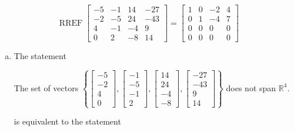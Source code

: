 \begin{exerciseAnswer} 


\[\operatorname{RREF} \left[\begin{array}{cccc}
-5 & -1 & 14 & -27 \\
-2 & -5 & 24 & -43 \\
4 & -1 & -4 & 9 \\
0 & 2 & -8 & 14
\end{array}\right] = \left[\begin{array}{cccc}
1 & 0 & -2 & 4 \\
0 & 1 & -4 & 7 \\
0 & 0 & 0 & 0 \\
0 & 0 & 0 & 0
\end{array}\right] \]


\begin{enumerate}[(a)]
\item The statement 
\begin{center}\begin{minipage}{0.8\textwidth}
 The set of vectors \( \left\{ \left[\begin{array}{c}
-5 \\
-2 \\
4 \\
0
\end{array}\right] , \left[\begin{array}{c}
-1 \\
-5 \\
-1 \\
2
\end{array}\right] , \left[\begin{array}{c}
14 \\
24 \\
-4 \\
-8
\end{array}\right] , \left[\begin{array}{c}
-27 \\
-43 \\
9 \\
14
\end{array}\right] \right\} \) does not span \(\mathbb{R}^4\). 
\end{minipage}\end{center}
     is equivalent to the statement 
\begin{center}\begin{minipage}{0.8\textwidth}
 The vector equation \( x_{1} \left[\begin{array}{c}
-5 \\

\end{array}
\end{minipage}
\end{center}
\end{enumerate}
\end{exerciseAnswer}
